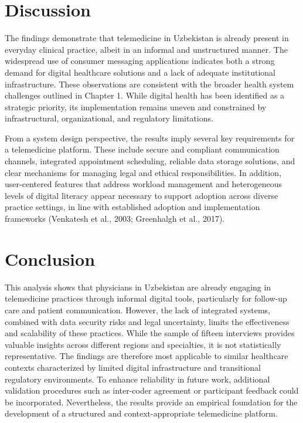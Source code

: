 \section{Discussion}

The findings demonstrate that telemedicine in Uzbekistan is already present in everyday clinical practice, albeit in an informal and unstructured manner. The widespread use of consumer messaging applications indicates both a strong demand for digital healthcare solutions and a lack of adequate institutional infrastructure. These observations are consistent with the broader health system challenges outlined in Chapter 1. While digital health has been identified as a strategic priority, its implementation remains uneven and constrained by infrastructural, organizational, and regulatory limitations.

From a system design perspective, the results imply several key requirements for a telemedicine platform. These include secure and compliant communication channels, integrated appointment scheduling, reliable data storage solutions, and clear mechanisms for managing legal and ethical responsibilities. In addition, user-centered features that address workload management and heterogeneous levels of digital literacy appear necessary to support adoption across diverse practice settings, in line with established adoption and implementation frameworks (Venkatesh et al., 2003; Greenhalgh et al., 2017).

\section{Conclusion}

This analysis shows that physicians in Uzbekistan are already engaging in telemedicine practices through informal digital tools, particularly for follow-up care and patient communication. However, the lack of integrated systems, combined with data security risks and legal uncertainty, limits the effectiveness and scalability of these practices. While the sample of fifteen interviews provides valuable insights across different regions and specialties, it is not statistically representative. The findings are therefore most applicable to similar healthcare contexts characterized by limited digital infrastructure and transitional regulatory environments. To enhance reliability in future work, additional validation procedures such as inter-coder agreement or participant feedback could be incorporated. Nevertheless, the results provide an empirical foundation for the development of a structured and context-appropriate telemedicine platform.

